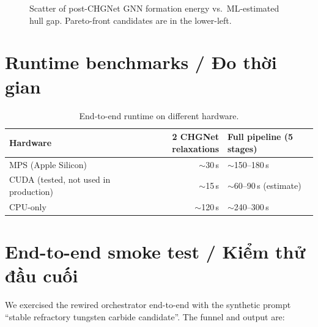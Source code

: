 \documentclass[11pt,a4paper]{report}
\newcommand{\eV}{eV/atom}
\begin{document}
\begin{figure}[h]
\centering
{}
\caption{Scatter of post-CHGNet GNN formation energy vs.\ ML-estimated hull gap.
  Pareto-front candidates are in the lower-left.}
\label{fig:scatter}
\end{figure}

\section{Runtime benchmarks / Đo thời gian}

\begin{table}[h]
\centering
\caption{End-to-end runtime on different hardware.}
\label{tab:runtime}
\begin{tabular}{lrl}
\toprule
\textbf{Hardware} & \textbf{2 CHGNet relaxations} & \textbf{Full pipeline (5 stages)} \\
\midrule
MPS (Apple Silicon) & $\sim$30\,s & $\sim$150--180\,s \\
CUDA (tested, not used in production) & $\sim$15\,s & $\sim$60--90\,s (estimate) \\
CPU-only & $\sim$120\,s & $\sim$240--300\,s \\
\bottomrule
\end{tabular}
\end{table}

\section{End-to-end smoke test / Kiểm thử đầu cuối}

We exercised the rewired orchestrator end-to-end with the synthetic prompt
``stable refractory tungsten carbide candidate''. The funnel and output are:
\end{document}

